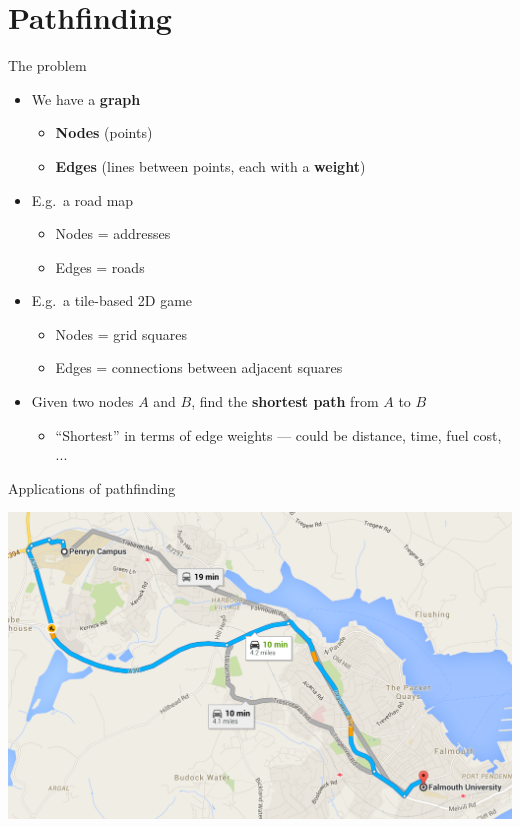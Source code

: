 \part{Pathfinding}
\frame{\partpage}

\begin{frame}{The problem}
    \begin{itemize}
        \item We have a \textbf{graph} \pause
            \begin{itemize}
                \item \textbf{Nodes} (points) \pause
                \item \textbf{Edges} (lines between points, each with a \textbf{weight}) \pause
            \end{itemize}
        \item E.g.\ a road map \pause
            \begin{itemize}
                \item Nodes = addresses \pause
                \item Edges = roads \pause
            \end{itemize}
        \item E.g.\ a tile-based 2D game \pause
            \begin{itemize}
                \item Nodes = grid squares \pause
                \item Edges = connections between adjacent squares \pause
            \end{itemize}
        \item Given two nodes $A$ and $B$, find the \textbf{shortest path} from $A$ to $B$ \pause
            \begin{itemize}
                \item ``Shortest'' in terms of edge weights --- could be distance, time, fuel cost, ...
            \end{itemize}
    \end{itemize}
\end{frame}

\begin{frame}{Applications of pathfinding}
    \begin{center}
        \includegraphics[width=\textwidth]{pathfinding_1}
    \end{center}
\end{frame}

